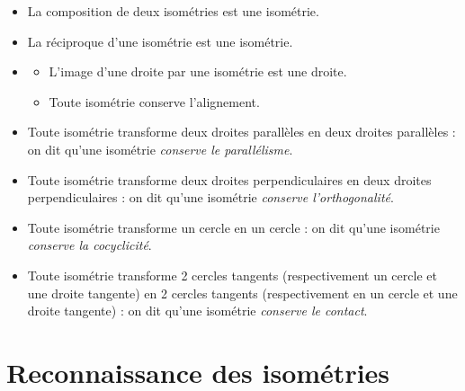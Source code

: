       \begin{prop}
            \begin{itemize}
                  \item La composition de deux isom\'etries est une isom\'etrie.
                  \item La r\'eciproque d'une isom\'etrie est une isom\'etrie.
                  \item \begin{itemize}
                              \item L'image d'une droite par une isom\'etrie est une droite.
                              \item Toute isom\'etrie conserve l'alignement.
                        \end{itemize}
                  \item Toute isom\'etrie transforme deux droites parall\`eles en deux droites parall\`eles :
                        on dit qu'une isom\'etrie \emph{conserve le parall\'elisme}.
                  \item Toute isom\'etrie transforme deux droites perpendiculaires en deux droites perpendiculaires :
                        on dit qu'une isom\'etrie \emph{conserve l'orthogonalit\'e}.
                  \item Toute isom\'etrie transforme un cercle en un cercle : 
                        on dit qu'une isom\'etrie \emph{conserve la cocyclicit\'e}.
                  \item Toute isom\'etrie transforme 2 cercles tangents 
                        (respectivement un cercle et une droite tangente)
                        en 2 cercles tangents
                        (respectivement en un cercle et une droite tangente) :
                        on dit qu'une isom\'etrie \emph{conserve le contact}.
            \end{itemize}
      \end{prop}
\section{Reconnaissance des isom\'etries}
